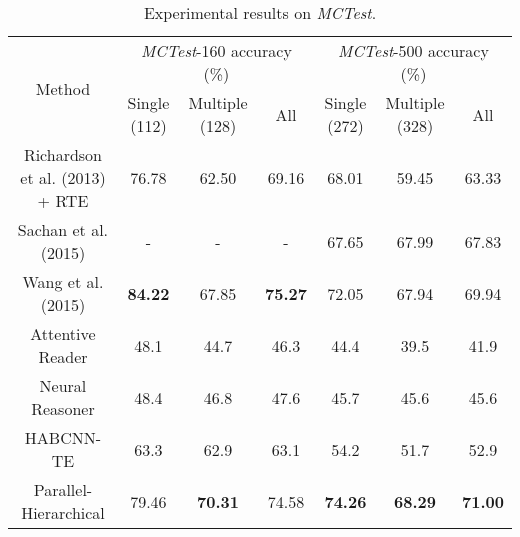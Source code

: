 \documentclass[11pt]{article}
\begin{document}
\begin{table*}[t]
	\small
	\centering
    \begin{tabular}{ | c || c | c | c || c | c | c |}
    	\hline
    	\multirow{2}{*}{Method} & \multicolumn{3}{|c|}{{\it MCTest}-160 accuracy (\%)} & \multicolumn{3}{|c|}{{\it MCTest}-500 accuracy (\%)} \\ \cline{2-7}
    	 & Single (112) & Multiple (128) & All & Single (272) & Multiple (328) & All \\ \hline \hline
    	 Richardson et al. (2013) + RTE & 76.78 & 62.50 & 69.16 & 68.01 & 59.45 & 63.33 \\
    	 Sachan et al. (2015) & - & - & - & 67.65 & 67.99 & 67.83 \\
    	 Wang et al. (2015) & \textbf{84.22} & 67.85 & \textbf{75.27} & 72.05 & 67.94 & 69.94 \\ \hline
    	 Attentive Reader & 48.1 & 44.7 & 46.3 & 44.4 & 39.5 & 41.9 \\
    	 Neural Reasoner & 48.4 & 46.8 & 47.6 & 45.7 & 45.6 & 45.6 \\
    	 HABCNN-TE & 63.3 & 62.9 & 63.1 & 54.2 & 51.7 & 52.9 \\
		 Parallel-Hierarchical & 79.46 & \textbf{70.31} & 74.58 & \textbf{74.26} & \textbf{68.29} & \textbf{71.00} \\
		\hline
    \end{tabular}
    \caption{Experimental results on {\it MCTest}.}
	\label{tab:results}
\end{table*}
\end{document}
